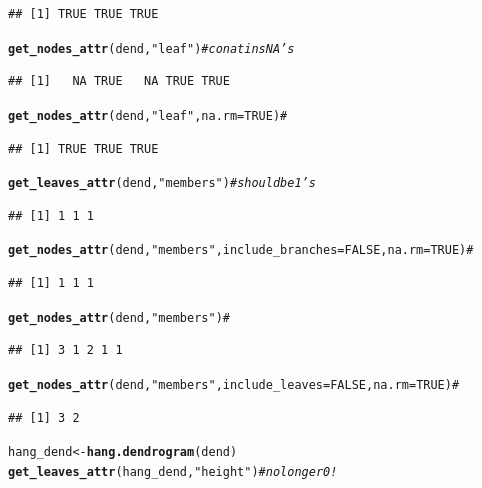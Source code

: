 \documentclass[shortnames,nojss,article]{jss}\usepackage[]{graphicx}\usepackage[]{color}
\makeatletter
\newcommand{\hlnum}[1]{\textcolor[rgb]{0.686,0.059,0.569}{#1}}%
\newcommand{\hlstr}[1]{\textcolor[rgb]{0.192,0.494,0.8}{#1}}%
\newcommand{\hlcom}[1]{\textcolor[rgb]{0.678,0.584,0.686}{\textit{#1}}}%
\newcommand{\hlstd}[1]{\textcolor[rgb]{0.345,0.345,0.345}{#1}}%
\newcommand{\hlkwb}[1]{\textcolor[rgb]{0.69,0.353,0.396}{#1}}%
\newcommand{\hlkwc}[1]{\textcolor[rgb]{0.333,0.667,0.333}{#1}}%
\newcommand{\hlkwd}[1]{\textcolor[rgb]{0.737,0.353,0.396}{\textbf{#1}}}%
\newenvironment{kframe}{%
 \def\at@end@of@kframe{}%
 \ifinner\ifhmode%
  \def\at@end@of@kframe{\end{minipage}}%
  \begin{minipage}{\columnwidth}%
 \fi\fi%
 \def\FrameCommand##1{\hskip\@totalleftmargin \hskip-\fboxsep
 \colorbox{shadecolor}{##1}\hskip-\fboxsep
     \hskip-\linewidth \hskip-\@totalleftmargin \hskip\columnwidth}%
 \MakeFramed {\advance\hsize-\width
   \@totalleftmargin\z@ \linewidth\hsize
   \@setminipage}}%
 {\par\unskip\endMakeFramed%
 \at@end@of@kframe}
\newenvironment{knitrout}{}{} %
\makeatother
\begin{document}
\begin{knitrout}
\begin{kframe}
\begin{alltt}
\end{alltt}
\begin{verbatim}
## [1] TRUE TRUE TRUE
\end{verbatim}
\begin{alltt}
\hlkwd{get_nodes_attr}\hlstd{(dend,} \hlstr{"leaf"}\hlstd{)}  \hlcom{# conatins NA's}
\end{alltt}
\begin{verbatim}
## [1]   NA TRUE   NA TRUE TRUE
\end{verbatim}
\begin{alltt}
\hlkwd{get_nodes_attr}\hlstd{(dend,} \hlstr{"leaf"}\hlstd{,} \hlkwc{na.rm} \hlstd{=} \hlnum{TRUE}\hlstd{)}  \hlcom{# }
\end{alltt}
\begin{verbatim}
## [1] TRUE TRUE TRUE
\end{verbatim}
\begin{alltt}
\hlkwd{get_leaves_attr}\hlstd{(dend,} \hlstr{"members"}\hlstd{)}  \hlcom{# should be 1's}
\end{alltt}
\begin{verbatim}
## [1] 1 1 1
\end{verbatim}
\begin{alltt}
\hlkwd{get_nodes_attr}\hlstd{(dend,} \hlstr{"members"}\hlstd{,} \hlkwc{include_branches} \hlstd{=} \hlnum{FALSE}\hlstd{,} \hlkwc{na.rm} \hlstd{=} \hlnum{TRUE}\hlstd{)}  \hlcom{# }
\end{alltt}
\begin{verbatim}
## [1] 1 1 1
\end{verbatim}
\begin{alltt}
\hlkwd{get_nodes_attr}\hlstd{(dend,} \hlstr{"members"}\hlstd{)}  \hlcom{# }
\end{alltt}
\begin{verbatim}
## [1] 3 1 2 1 1
\end{verbatim}
\begin{alltt}
\hlkwd{get_nodes_attr}\hlstd{(dend,} \hlstr{"members"}\hlstd{,} \hlkwc{include_leaves} \hlstd{=} \hlnum{FALSE}\hlstd{,} \hlkwc{na.rm} \hlstd{=} \hlnum{TRUE}\hlstd{)}  \hlcom{# }
\end{alltt}
\begin{verbatim}
## [1] 3 2
\end{verbatim}
\begin{alltt}
\hlstd{hang_dend} \hlkwb{<-} \hlkwd{hang.dendrogram}\hlstd{(dend)}
\hlkwd{get_leaves_attr}\hlstd{(hang_dend,} \hlstr{"height"}\hlstd{)}  \hlcom{# no longer 0!}
\end{alltt}
\begin{verbatim}

\end{verbatim}
\end{kframe}
\end{knitrout}
\end{document}
